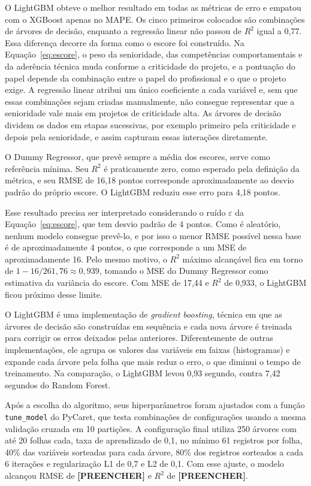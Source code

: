 O LightGBM obteve o melhor resultado em todas as métricas de erro e empatou com o XGBoost apenas no MAPE. Os cinco primeiros colocados são combinações de árvores de decisão, enquanto a regressão linear não passou de $R^2$ igual a 0,77. Essa diferença decorre da forma como o escore foi construído. Na Equação~\ref{eq:escore}, o peso da senioridade, das competências comportamentais e da aderência técnica muda conforme a criticidade do projeto, e a pontuação do papel depende da combinação entre o papel do profissional e o que o projeto exige. A regressão linear atribui um único coeficiente a cada variável e, sem que essas combinações sejam criadas manualmente, não consegue representar que a senioridade vale mais em projetos de criticidade alta. As árvores de decisão dividem os dados em etapas sucessivas, por exemplo primeiro pela criticidade e depois pela senioridade, e assim capturam essas interações diretamente.

O Dummy Regressor, que prevê sempre a média dos escores, serve como referência mínima. Seu $R^2$ é praticamente zero, como esperado pela definição da métrica, e seu RMSE de 16,18 pontos corresponde aproximadamente ao desvio padrão do próprio escore. O LightGBM reduziu esse erro para 4,18 pontos.

Esse resultado precisa ser interpretado considerando o ruído $\varepsilon$ da Equação~\ref{eq:escore}, que tem desvio padrão de 4 pontos. Como é aleatório, nenhum modelo consegue prevê-lo, e por isso o menor RMSE possível nessa base é de aproximadamente 4 pontos, o que corresponde a um MSE de aproximadamente 16. Pelo mesmo motivo, o $R^2$ máximo alcançável fica em torno de $1 - 16/261{,}76 \approx 0{,}939$, tomando o MSE do Dummy Regressor como estimativa da variância do escore. Com MSE de 17,44 e $R^2$ de 0,933, o LightGBM ficou próximo desse limite.

O LightGBM \cite{ke2017lightgbm} é uma implementação de \textit{gradient boosting}, técnica em que as árvores de decisão são construídas em sequência e cada nova árvore é treinada para corrigir os erros deixados pelas anteriores. Diferentemente de outras implementações, ele agrupa os valores das variáveis em faixas (histogramas) e expande cada árvore pela folha que mais reduz o erro, o que diminui o tempo de treinamento. Na comparação, o LightGBM levou 0,93 segundo, contra 7,42 segundos do Random Forest.

Após a escolha do algoritmo, seus hiperparâmetros foram ajustados com a função \texttt{tune\_model} do PyCaret, que testa combinações de configurações usando a mesma validação cruzada em 10 partições. A configuração final utiliza 250 árvores com até 20 folhas cada, taxa de aprendizado de 0,1, no mínimo 61 registros por folha, 40\% das variáveis sorteadas para cada árvore, 80\% dos registros sorteados a cada 6 iterações e regularização L1 de 0,7 e L2 de 0,1. Com esse ajuste, o modelo alcançou RMSE de \textbf{[PREENCHER]} e $R^2$ de \textbf{[PREENCHER]}.

